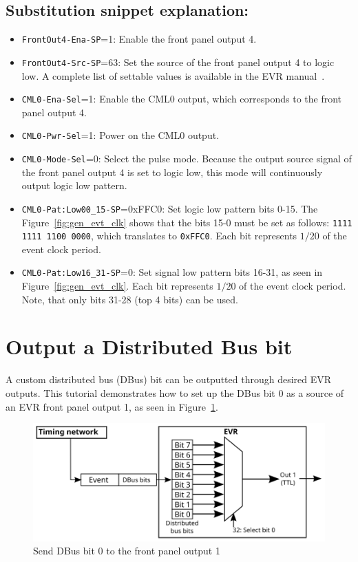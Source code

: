 \documentclass[12pt,a4paper]{article}
\begin{document}
\subsection{Substitution snippet explanation:}\label{sec:explain_cml}
\begin{itemize}
	\item \texttt{FrontOut4-Ena-SP}=1: Enable the front panel output 4.
	\item \texttt{FrontOut4-Src-SP}=63: Set the source of the front panel output 4 to logic low. A complete list of settable values is available in the EVR manual~\cite{evr_manual}.
	\item \texttt{CML0-Ena-Sel}=1: Enable the CML0 output, which corresponds to the front panel output 4.
	\item \texttt{CML0-Pwr-Sel}=1: Power on the CML0 output.
	\item \texttt{CML0-Mode-Sel}=0: Select the pulse mode. Because the output source signal of the front panel output 4 is set to logic low, this mode will continuously output logic low pattern.
	\item \texttt{CML0-Pat:Low00\_15-SP}=0xFFC0: Set logic low pattern bits 0-15. The Figure~\ref{fig:gen_evt_clk} shows that the bits 15-0 must be set as follows: \texttt{1111 1111 1100 0000}, which translates to \texttt{0xFFC0}. Each bit represents $1/20$ of the event clock period.
	\item \texttt{CML0-Pat:Low16\_31-SP}=0: Set signal low pattern bits 16-31, as seen in Figure~\ref{fig:gen_evt_clk}. Each bit represents $1/20$ of the event clock period. Note, that only bits 31-28 (top 4 bits) can be used.
\end{itemize}


\section{Output a Distributed Bus bit}
A custom distributed bus (DBus) bit can be outputted through desired EVR outputs. This tutorial demonstrates how to set up the DBus bit 0 as a source of an EVR front panel output 1, as seen in Figure~\ref{fig:dbus}. 

\begin{figure}[H]
	\centering
	\includegraphics[]{./img/dbus}
	\caption{Send DBus bit 0 to the front panel output 1}
	\label{fig:dbus}
\end{figure}
\end{document}
